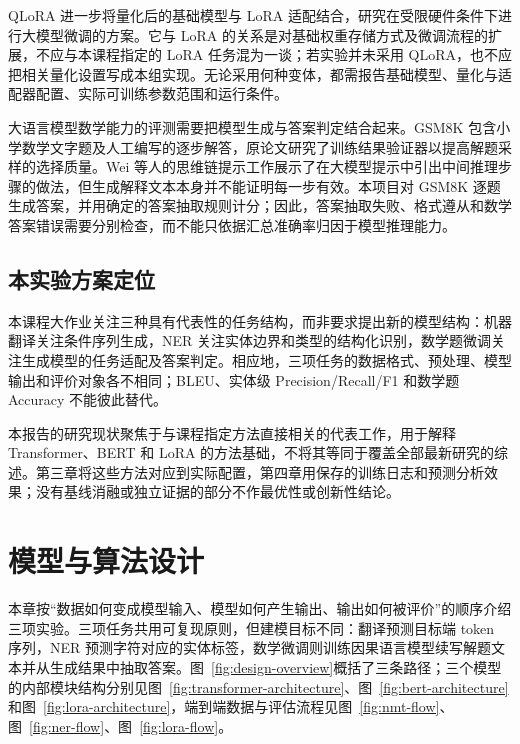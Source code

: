 \documentclass[UTF8,a4paper,12pt,fontset=none]{ctexart}
\begin{document}
QLoRA 进一步将量化后的基础模型与 LoRA 适配结合，研究在受限硬件条件下进行大模型微调的方案\cite{qlora}。它与 LoRA 的关系是对基础权重存储方式及微调流程的扩展，不应与本课程指定的 LoRA 任务混为一谈；若实验并未采用 QLoRA，也不应把相关量化设置写成本组实现。无论采用何种变体，都需报告基础模型、量化与适配器配置、实际可训练参数范围和运行条件。

大语言模型数学能力的评测需要把模型生成与答案判定结合起来。GSM8K 包含小学数学文字题及人工编写的逐步解答，原论文研究了训练结果验证器以提高解题采样的选择质量\cite{gsm8k}。Wei 等人的思维链提示工作展示了在大模型提示中引出中间推理步骤的做法，但生成解释文本本身并不能证明每一步有效\cite{cot}。本项目对 GSM8K 逐题生成答案，并用确定的答案抽取规则计分；因此，答案抽取失败、格式遵从和数学答案错误需要分别检查，而不能只依据汇总准确率归因于模型推理能力。

\subsection{本实验方案定位}
本课程大作业关注三种具有代表性的任务结构，而非要求提出新的模型结构：机器翻译关注条件序列生成，NER 关注实体边界和类型的结构化识别，数学题微调关注生成模型的任务适配及答案判定。相应地，三项任务的数据格式、预处理、模型输出和评价对象各不相同；BLEU、实体级 Precision/Recall/F1 和数学题 Accuracy 不能彼此替代。

本报告的研究现状聚焦于与课程指定方法直接相关的代表工作，用于解释 Transformer、BERT 和 LoRA 的方法基础，不将其等同于覆盖全部最新研究的综述。第三章将这些方法对应到实际配置，第四章用保存的训练日志和预测分析效果；没有基线消融或独立证据的部分不作最优性或创新性结论。



\section{模型与算法设计}

本章按“数据如何变成模型输入、模型如何产生输出、输出如何被评价”的顺序介绍三项实验。三项任务共用可复现原则，但建模目标不同：翻译预测目标端 token 序列，NER 预测字符对应的实体标签，数学微调则训练因果语言模型续写解题文本并从生成结果中抽取答案。图~\ref{fig:design-overview}概括了三条路径；三个模型的内部模块结构分别见图~\ref{fig:transformer-architecture}、图~\ref{fig:bert-architecture} 和图~\ref{fig:lora-architecture}，端到端数据与评估流程见图~\ref{fig:nmt-flow}、图~\ref{fig:ner-flow}、图~\ref{fig:lora-flow}。
\end{document}
